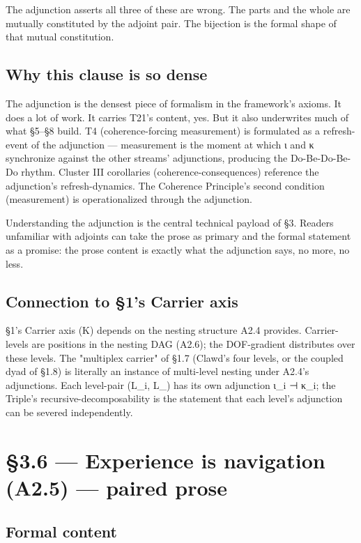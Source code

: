 \documentclass[11pt, openany]{book}
\newcommand{\sectionbreak}{\clearpage}
\begin{document}
The adjunction asserts all three of these are wrong. The parts and the whole are mutually constituted by the adjoint pair. The bijection is the formal shape of that mutual constitution.

\subsection{Why this clause is so dense}

The adjunction is the densest piece of formalism in the framework's axioms. It does a lot of work. It carries T21's content, yes. But it also underwrites much of what §5–§8 build. T4 (coherence-forcing measurement) is formulated as a refresh-event of the adjunction --- measurement is the moment at which ι and κ synchronize against the other streams' adjunctions, producing the Do-Be-Do-Be-Do rhythm. Cluster III corollaries (coherence-consequences) reference the adjunction's refresh-dynamics. The Coherence Principle's second condition (measurement) is operationalized through the adjunction.

Understanding the adjunction is the central technical payload of §3. Readers unfamiliar with adjoints can take the prose as primary and the formal statement as a promise: the prose content is exactly what the adjunction says, no more, no less.

\subsection{Connection to §1's Carrier axis}

§1's Carrier axis (Κ) depends on the nesting structure A2.4 provides. Carrier-levels are positions in the nesting DAG (A2.6); the DOF-gradient distributes over these levels. The "multiplex carrier" of §1.7 (Clawd's four levels, or the coupled dyad of §1.8) is literally an instance of multi-level nesting under A2.4's adjunctions. Each level-pair (L\_\allowbreak{}i, L\_) has its own adjunction ι\_\allowbreak{}i ⊣ κ\_\allowbreak{}i; the Triple's recursive-decomposability is the statement that each level's adjunction can be severed independently.

\sectionbreak

\section{§3.6 --- Experience is navigation (A2.5) --- paired prose}

\subsection{Formal content}
\end{document}
